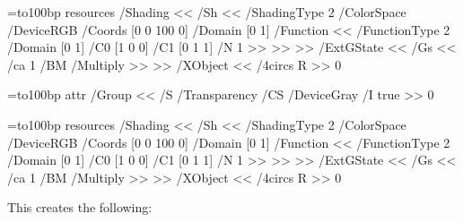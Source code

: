 =\hbox to100bp{\vrule width0bp height100bp depth0bp%
\hfil}
\pdfxform resources {
    /Shading << /Sh <<
        /ShadingType 2
        /ColorSpace /DeviceRGB
        /Coords [0 0 100 0]
        /Domain [0 1]
        /Function <<
            /FunctionType 2
            /Domain [0 1]
            /C0 [1 0 0]
            /C1 [0 1 1]
            /N 1
        >>
    >> >>
    /ExtGState << /Gs <<
        /ca 1
        /BM /Multiply
    >> >>
    /XObject <<
        /4circs \fourcircsform{} R
    >>
}0
\xdef\fourcircs{\pdfrefxform\the\pdflastxform\relax}
\egroup
\elisting

\bgroup
{}=\hbox to100bp{\vrule width0bp height100bp depth0bp%
\hfil}
\immediate\pdfxform attr{
    /Group <<
        /S /Transparency
        /CS /DeviceGray
        /I true
    >>
}0
\edef\fourcircsform{\the\pdflastxform}

=\hbox to100bp{\vrule width0bp height100bp depth0bp%
\hfil}
\pdfxform resources {
    /Shading << /Sh <<
        /ShadingType 2
        /ColorSpace /DeviceRGB
        /Coords [0 0 100 0]
        /Domain [0 1]
        /Function <<
            /FunctionType 2
            /Domain [0 1]
            /C0 [1 0 0]
            /C1 [0 1 1]
            /N 1
        >>
    >> >>
    /ExtGState << /Gs <<
        /ca 1
        /BM /Multiply
    >> >>
    /XObject <<
        /4circs \fourcircsform{} R
    >>
}0
\xdef\fourcircs{\pdfrefxform\the\pdflastxform\relax}
\egroup

This creates the following:

\centerline{\fourcircs}

